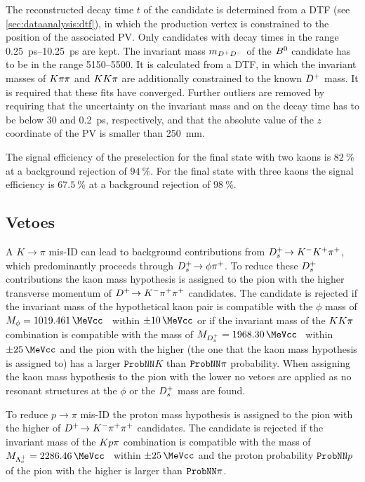The reconstructed decay time $t$ of the \Bd candidate is determined from a DTF
(see \cref{sec:dataanalysis:dtf}), in which the \Bd production vertex is
constrained to the position of the associated PV. Only candidates with decay
times in the range \SIrange{0.25}{10.25}{\ps} are kept. The invariant mass
$m_{{{D}^+}{{D}^-}}$ of the ${{B}^0}$ candidate has to be in the range
\SIrange{5150}{5500}{\MeVcc}. It is calculated from a DTF, in which the
invariant masses of $K\pi\pi$ and $KK\pi$ are additionally constrained to the
known ${{D}^+}$ mass. It is required that these fits have converged. Further
outliers are removed by requiring that the uncertainty on the invariant mass
and on the decay time has to be below \SI{30}{\MeVcc} and \SI{0.2}{\ps},
respectively, and that the absolute value of the $z$ coordinate of the PV is
smaller than \SI{250}{\milli\meter}.

The signal efficiency of the preselection for the final state with two kaons
is $\SI{82}{\percent}$ at a background rejection of $\SI{94}{\percent}$. For
the final state with three kaons the signal efficiency is
$\SI{67.5}{\percent}$ at a background rejection of $\SI{98}{\percent}$.

\subsection{Vetoes}
\label{sec:b02dd:selection:vetoes}

A $K\rightarrow\pi$ mis-ID can lead to background contributions from
${{D}^+_{s}}\!\rightarrow {\ensuremath{{K}^-}}{\ensuremath{{K}^+}}{\ensuremath{{\pi}^+}}$, which predominantly proceeds through ${{D}^+_{s}}\!\rightarrow \phi{\ensuremath{{\pi}^+}}$. To reduce
these ${{D}^+_{s}}$ contributions the kaon mass hypothesis is assigned to the pion
with the higher transverse momentum of ${{D}^+}\!\rightarrow {\ensuremath{{K}^-}}{\ensuremath{{\pi}^+}}{\ensuremath{{\pi}^+}}$ candidates. The candidate
is rejected if the invariant mass of the hypothetical kaon pair is compatible
with the $\phi$ mass of $M_{\phi} = \SI{1019.461}{\MeVcc}$~\cite{PDG2014}
within $\pm\SI{10}{\MeVcc}$ or if the invariant mass of the ${K}{K}{\pi}$
combination is compatible with the \Dsp mass of $M_{\Dsp} =
\SI{1968.30}{\MeVcc}$~\cite{PDG2014} within $\pm\SI{25}{\MeVcc}$ and the pion
with the higher \pT (the one that the kaon mass hypothesis is assigned to) has
a larger $\texttt{ProbNN}K$ than $\texttt{ProbNN}{\ensuremath{\pi}}$ probability. When
assigning the kaon mass hypothesis to the pion with the lower \pT no vetoes
are applied as no resonant structures at the $\phi$ or the ${{D}^+_{s}}$ mass are
found.

To reduce $p\rightarrow\pi$ mis-ID the proton mass hypothesis is assigned to
the pion with the higher \pT of ${{D}^+}\!\rightarrow {\ensuremath{{K}^-}}{\ensuremath{{\pi}^+}}{\ensuremath{{\pi}^+}}$ candidates. The candidate is
rejected if the invariant mass of the ${K}{p}{\pi}$ combination is
compatible with the \Lc mass of $M_{\Lc} =
\SI{2286.46}{\MeVcc}$~\cite{PDG2014} within $\pm\SI{25}{\MeVcc}$ and the
proton probability $\texttt{ProbNN}p$ of the pion with the higher \pT is
larger than $\texttt{ProbNN}{\ensuremath{\pi}}$.

